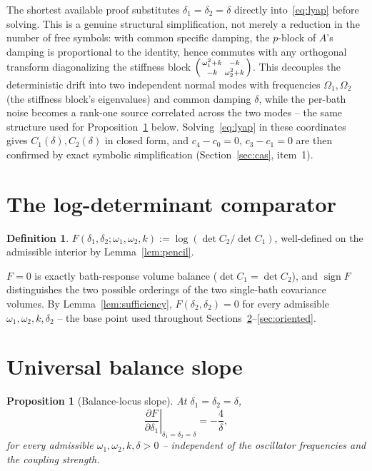 \documentclass[11pt]{article}
\newtheorem{proposition}{Proposition}
\theoremstyle{definition}
\newtheorem{definition}{Definition}
\newcommand{\dd}[2]{\frac{\partial #1}{\partial #2}}
\begin{document}
The shortest available proof substitutes $\delta_1=\delta_2=\delta$
directly into~\eqref{eq:lyap} before solving. This is a genuine
structural simplification, not merely a reduction in the number of free
symbols: with common specific damping, the $p$-block of $A$'s damping is
proportional to the identity, hence commutes with any orthogonal
transform diagonalizing the stiffness block
$\begin{psmallmatrix}\omega_1^2+k&-k\\-k&\omega_2^2+k\end{psmallmatrix}$.
This decouples the deterministic drift into two independent normal modes
with frequencies $\Omega_1,\Omega_2$ (the stiffness block's eigenvalues)
and common damping $\delta$, while the per-bath noise becomes a rank-one
source correlated across the two modes -- the same structure used for
Proposition~\ref{prop:slope} below. Solving~\eqref{eq:lyap} in these
coordinates gives $C_1(\delta),C_2(\delta)$ in closed form, and
$c_4-c_0=0$, $c_3-c_1=0$ are then confirmed by exact symbolic
simplification (Section~\ref{sec:cas}, item~1).

\section{The log-determinant comparator}

\begin{definition}
\label{def:F}
$F(\delta_1,\delta_2;\omega_1,\omega_2,k) := \log(\det C_2/\det C_1)$,
well-defined on the admissible interior by Lemma~\ref{lem:pencil}.
\end{definition}

$F=0$ is exactly bath-response volume balance ($\det C_1=\det C_2$), and
$\operatorname{sign}F$ distinguishes the two possible orderings of the
two single-bath covariance volumes. By Lemma~\ref{lem:sufficiency},
$F(\delta_2,\delta_2)=0$ for every admissible $\omega_1,\omega_2,k,
\delta_2$ -- the base point used throughout Sections~\ref{sec:slope}--\ref{sec:oriented}.

\section{Universal balance slope}
\label{sec:slope}

\begin{proposition}[Balance-locus slope]
\label{prop:slope}
At $\delta_1=\delta_2=\delta$,
\[
\left.\dd{F}{\delta_1}\right|_{\delta_1=\delta_2=\delta} = -\frac{4}{\delta},
\]
for every admissible $\omega_1,\omega_2,k,\delta>0$ -- independent of the
oscillator frequencies and the coupling strength.
\end{proposition}
\end{document}

